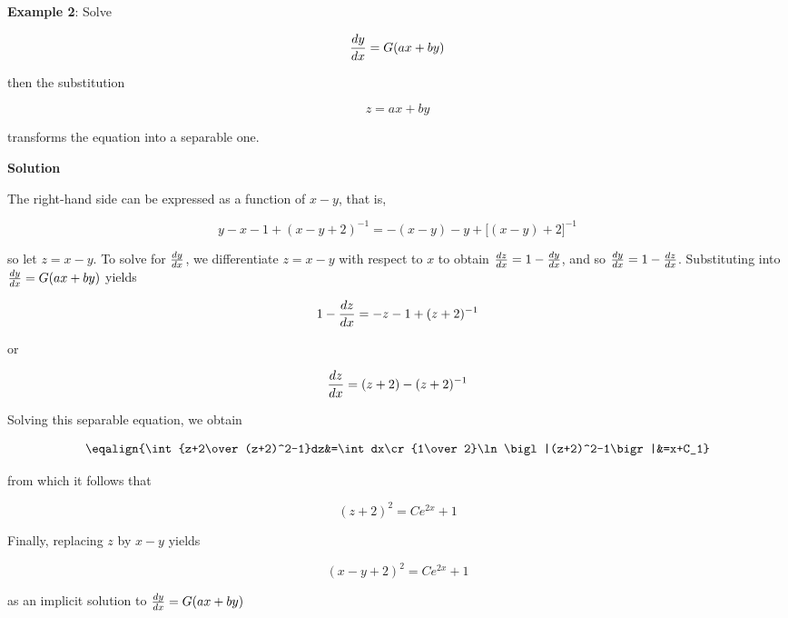 \nopagenumbers
{\bf Example 2}: Solve

$${dy\over dx}=G(ax+by)$$

then the substitution

$$z=ax+by$$

transforms the equation into a separable one.

\vskip 6pt
{\bf Solution}

\vskip 6pt
The right-hand side can be expressed as a function of $x-y$, that is,

$$y-x-1+(x-y+2)^{-1}=-(x-y)-y+\bigl[(x-y)+2\bigr]^{-1}$$

so let $z=x-y$. To solve for ${dy\over dx}$, we differentiate $z=x-y$ with respect to $x$ to obtain ${dz\over dx}=1-{dy\over dx}$, and so ${dy\over dx}=1-{dz\over dx}$. Substituting into ${dy\over dx}=G(ax+by)$ yields

$$1-{dz\over dx}=-z-1+(z+2)^{-1}$$

or

$${dz\over dx}=(z+2)-(z+2)^{-1}$$

Solving this separable equation, we obtain

$$\eqalign{\int{z+2\over (z+2)^2-1}dz&=\int dx\cr
	{1\over 2}\ln\bigl|(z+2)^2-1\bigr|&=x+C_1}$$

from which it follows that

$$(z+2)^2=Ce^{2x}+1$$

Finally, replacing $z$ by $x-y$ yields

$$(x-y+2)^2=Ce^{2x}+1$$

as an implicit solution to ${dy\over dx}=G(ax+by)$


\vfill\eject
\bye
